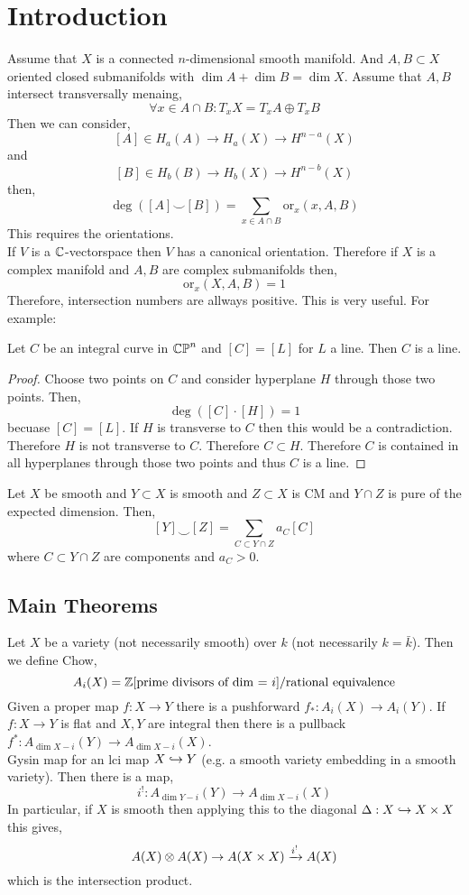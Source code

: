 \documentclass[12pt]{article}
\begin{document}
\section{Introduction}

Assume that $X$ is a connected $n$-dimensional smooth manifold. And $A, B \subset X$ oriented closed submanifolds with $\dim{A} + \dim{B} = \dim{X}$. Assume that $A, B$ intersect transversally menaing,
\[ \forall x \in A \cap B : T_x X = T_x A \oplus T_x B \]
Then we can consider,
\[ [A] \in H_a(A) \to H_a(X) \to H^{n-a}(X) \]
and
\[ [B] \in H_b(B) \to H_b(X) \to H^{n-b}(X) \]
then,
\[ \deg{([A] \smile [B])} = \sum_{x \in A \cap B} \mathrm{or}_x(x, A, B) \]
This requires the orientations. 
\bigskip\\
If $V$ is a $\mathbb{C}$-vectorspace then $V$ has a canonical orientation. Therefore if $X$ is a complex manifold and $A, B$ are complex submanifolds then,
\[ \mathrm{or}_x(X, A, B) =  1 \]
Therefore, intersection numbers are allways positive. This is very useful. For example:

\begin{prop}
Let $C$ be an integral curve in $\mathbb{CP}^n$ and $[C] = [L]$ for $L$ a line. Then $C$ is a line.
\end{prop}

\begin{proof}
Choose two points on $C$ and consider hyperplane $H$ through those two points. Then,
\[ \deg{([C] \cdot [H])} = 1 \]
becuase $[C] = [L]$. If $H$ is transverse to $C$ then this would be a contradiction. Therefore $H$ is not transverse to $C$. Therefore $C \subset H$. Therefore $C$ is contained in all hyperplanes through those two points and thus $C$ is a line. 
\end{proof}

\begin{prop}
Let $X$ be smooth and $Y \subset X$ is smooth and $Z \subset X$ is CM and $Y \cap Z$ is pure of the expected dimension. Then,
\[ [Y] \smile [Z] = \sum_{C \subset Y \cap Z} a_C [C] \]
where $C \subset Y \cap Z$ are components and $a_C > 0$. 
\end{prop}



\subsection{Main Theorems}

Let $X$ be a variety (not necessarily smooth) over $k$ (not necessarily $k = \bar{k}$). Then we define Chow,
\[ A_i(X) = \mathbb{Z}[ \text{prime divisors of dim = } i ] / \text{rational equivalence} \]
Given a proper map $f : X \to Y$ there is a pushforward $f_* : A_i(X) \to A_i(Y)$. If $f : X \to Y$ is flat and $X, Y$ are integral then there is a pullback $f^* : A_{\dim{X}-i}(Y) \to A_{\dim{X}-i}(X)$.
\bigskip\\
Gysin map for an lci map $X \hookrightarrow Y$ (e.g. a smooth variety embedding in a smooth variety). Then there is a map,
\[ i^! : A_{\dim{Y} - i}(Y) \to A_{\dim{X}-i}(X) \]
In particular, if $X$ is smooth then applying this to the diagonal $\Delta : X \hookrightarrow X \times X$ this gives,
\[ A(X) \otimes A(X) \to A(X \times X) \xrightarrow{i^!} A(X) \]
which is the intersection product.
\end{document}
